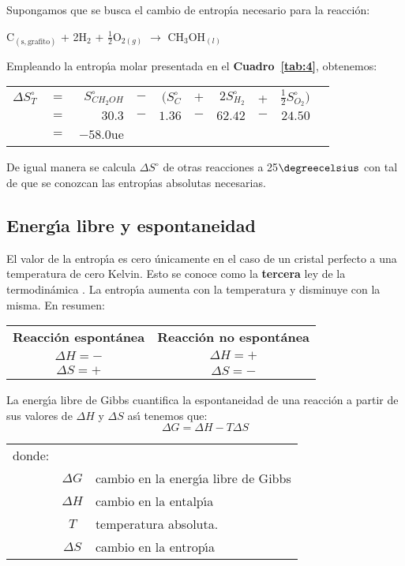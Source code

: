 \begin{example}
 Supongamos que se busca el cambio de entrop\'{\i}a necesario para la reacci\'on:
\begin{center}
C$_{(\mathrm{s,grafito})}$ + 2H$_2$ + $\frac{1}{2}$O$_{2(g)}$ $\longrightarrow$  CH$_3$OH$_{(l)}$
\end{center}
Empleando la entrop\'{\i}a molar presentada en el \textbf{Cuadro~\ref{tab:4}}, obtenemos:

\begin{tabular}{rcrcrcrcrc}
$\Delta S^\circ _T$ &$=$&$S^\circ _{CH_2OH}$&$-$&$(S^\circ
_C$&$+$&$2S^\circ_{H_2}$&+&$\frac{1}{2} S^\circ_{O_2})$\\
&$=$ &$30.3$ & $-$& $1.36$ &$-$&$62.42$&$-$&$24.50$\\
&$=$ &$-58.0 $ue&&&&&&\\
\end{tabular}

De igual manera se calcula $\Delta S^\circ$ de otras reacciones a 25$\degreecelsius$ con tal de que
se conozcan las entrop\'{\i}as absolutas necesarias.
\end{example}

\subsection{Energ\'{\i}a libre y espontaneidad}
El valor de la entrop\'{\i}a es cero \'unicamente en el caso de un cristal per\-fec\-to a una temperatura de cero Kelvin. Esto se conoce como la \textbf{tercera} ley de la termodin\'amica . La entrop\'{\i}a aumenta con la temperatura y
disminuye con la mis\-ma. En resumen:\\
\begin{center}
\begin{tabular}{cc}
\textbf{Reacci\'on espont\'anea} & \textbf{Reacci\'on no espont\'anea }\\
$\Delta H = -$ & $\Delta  H = +$\\
$\Delta S = +$ & $\Delta  S = -$ \\
\end{tabular}
\end{center}
La energ\'{\i}a libre de Gibbs cuantifica la espontaneidad de una reacci\'on a partir de sus
valores de $\Delta H$ y $\Delta S$ as\'{\i} tenemos que:
\begin{equation}
\Delta G = \Delta H - T\Delta S
\label{eq:6}
\end{equation}
\begin{tabular}{lcl}
donde:&\\
&$\Delta G$& cambio en la energ\'{\i}a libre de Gibbs \\
&$\Delta H$ &cambio en la entalp\'{\i}a\\
&$T$ &temperatura absoluta.\\
&$\Delta S$ &cambio en la entrop\'{\i}a\\
\end{tabular}

